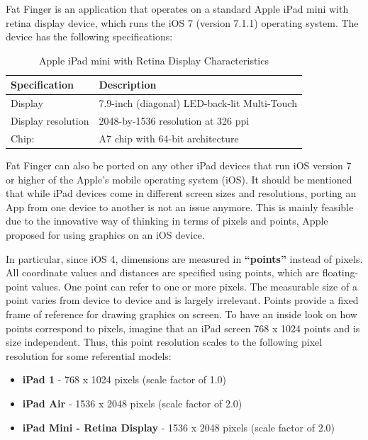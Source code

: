 
Fat Finger is an application that operates on a standard Apple iPad mini with retina display device, which runs the iOS 7 (version 7.1.1) operating system. The device has the following specifications:


\begin{table}[H]
\centering
\begin{tabular}{l || l }
Specification & Description \\
\hline
Display & 7.9-inch (diagonal) LED-back-lit Multi-Touch \\
Display resolution & 2048-by-1536 resolution at 326 ppi
\\
Chip: & A7 chip with 64-bit architecture
\end{tabular}
\caption{Apple iPad mini with Retina Display Characteristics}
\label{tab:ipadspecs}
\end{table}


Fat Finger can also be ported on any other iPad devices that run iOS version 7 or higher of the Apple's mobile operating system (iOS). It should be mentioned that while iPad devices come in different screen sizes and resolutions, porting an App from one device to another is not an issue anymore. This is mainly feasible due to the innovative way of thinking in terms of pixels and points, Apple proposed for using graphics on an iOS device. 


In particular, since iOS 4, dimensions are measured in \textbf{“points”} instead of pixels. All coordinate values and distances are specified using points, which are floating-point values. One point can refer to one or more pixels. The measurable size of a point varies from device to device and is largely irrelevant. Points provide a fixed frame of reference for drawing graphics on screen. To have an inside look on how points correspond to pixels, imagine that an iPad screen 768 x 1024 points and is size independent. Thus, this point resolution scales to the following pixel resolution for some referential models:


\begin{itemize}
    \item \textbf{iPad 1} - 768 x 1024 pixels (scale factor of 1.0)
    \item \textbf{iPad Air} - 1536 x 2048 pixels (scale factor of 2.0)
    \item \textbf{iPad Mini - Retina Display} - 1536 x 2048 pixels (scale factor of 2.0)
 \end{itemize}

